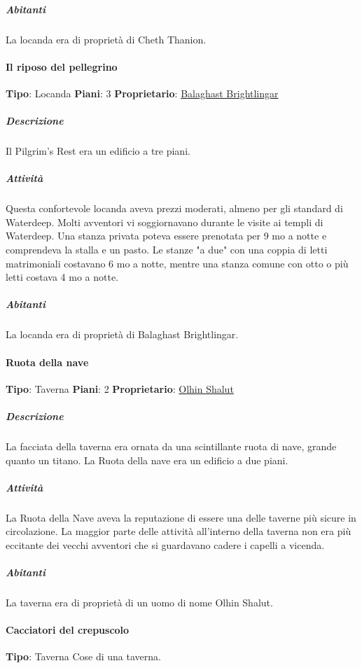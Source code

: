 \documentclass{article}
\begin{document}
                      \subparagraph{Abitanti}
                        La locanda era di proprietà di Cheth Thanion.
                  \paragraph{Il riposo del pellegrino}
                  \textbf{Tipo}: Locanda
                  \textbf{Piani}: 3
                  \textbf{Proprietario}: \href{https://forgottenrealms.fandom.com/wiki/Balaghast_Brightlingar}{Balaghast Brightlingar}

                      \subparagraph{Descrizione}
                        Il Pilgrim's Rest era un edificio a tre piani.

                      \subparagraph{Attività}
                        Questa confortevole locanda aveva prezzi moderati, almeno per gli standard di Waterdeep. Molti avventori vi soggiornavano durante le visite ai templi di Waterdeep. Una stanza privata poteva essere prenotata per 9  mo a notte e comprendeva la stalla e un pasto. Le stanze "a due" con una coppia di letti matrimoniali costavano 6  mo a notte, mentre una stanza comune con otto o più letti costava 4  mo a notte.

                      \subparagraph{Abitanti}
                        La locanda era di proprietà di Balaghast Brightlingar.
                  \paragraph{Ruota della nave}
                  \textbf{Tipo}: Taverna
                  \textbf{Piani}: 2
                  \textbf{Proprietario}: \href{https://forgottenrealms.fandom.com/wiki/Olhin_Shalut}{Olhin Shalut}
                      \subparagraph{Descrizione}
                        La facciata della taverna era ornata da una scintillante ruota di nave, grande quanto un titano. La Ruota della nave era un edificio a due piani.

                      \subparagraph{Attività}
                        La Ruota della Nave aveva la reputazione di essere una delle taverne più sicure in circolazione. La maggior parte delle attività all'interno della taverna non era più eccitante dei vecchi avventori che si guardavano cadere i capelli a vicenda.

                      \subparagraph{Abitanti}
                        La taverna era di proprietà di un uomo di nome Olhin Shalut.
                  \paragraph{Cacciatori del crepuscolo}
                  \textbf{Tipo}: Taverna
                    Cose di una taverna.
\end{document}

